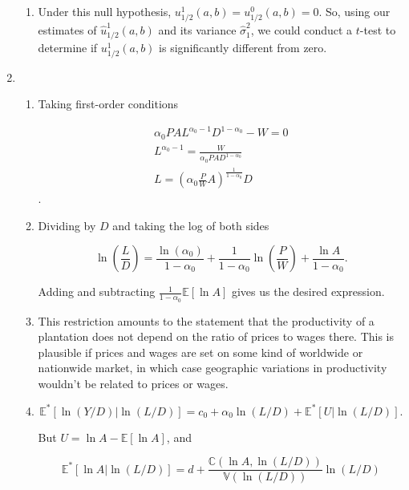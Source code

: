 \documentclass{article}
\begin{document}
\begin{enumerate}
\begin{enumerate}
		\item

		Under this null hypothesis, $u_{1/2}^1(a,b) = u_{1/2}^0(a,b) = 0$. So, using our estimates of $\hat{u}_{1/2}^1(a,b)$ and its variance $\hat{\sigma}^2_1$, we could conduct a $t$-test to determine if $u_{1/2}^1(a,b)$ is significantly different from zero.

	\end{enumerate}

	\item

	\begin{enumerate}

		\item

		Taking first-order conditions

		\begin{align*}
		\alpha_0 PA L^{\alpha_0 - 1} D^{1-\alpha_0} - W = 0 \\
		L^{\alpha_0-1}= \frac{W}{\alpha_0 PA D^{1-\alpha_0}} \\
		L= \left( \alpha_0 \frac{P}{W} A \right)^{\frac{1}{1-\alpha_0}}D
		\end{align*}.

		\item

		Dividing by $D$ and taking the log of both sides

		$$\ln \left( \frac{L}{D} \right) = \frac{\ln(\alpha_0)}{1-\alpha_0} + \frac{1}{1-\alpha_0} \ln \left(\frac{P}{W} \right) + \frac{\ln A}{1-\alpha_0}.$$

		Adding and subtracting $\frac{1}{1-\alpha_0} \mathbb{E}[\ln A]$ gives us the desired expression.

		\item

		This restriction amounts to the statement that the productivity of a plantation does not depend on the ratio of prices to wages there. This is plausible if prices and wages are set on some kind of worldwide or nationwide market, in which case geographic variations in productivity wouldn't be related to prices or wages.

		\item 

		$$\mathbb{E}^*[\ln (Y/D) | \ln(L/D)] = c_0 + \alpha_0 \ln(L/D) + \mathbb{E}^*[U | \ln(L/D)].$$

		But $U = \ln A - \mathbb{E}[\ln A]$, and

		$$\mathbb{E}^*[\ln A | \ln(L/D)] = d + \frac{\mathbb{C}(\ln A, \ln(L/D))}{\mathbb{V}(\ln(L/D))} \ln(L/D)$$


\end{enumerate}
\end{enumerate}
\end{document}
